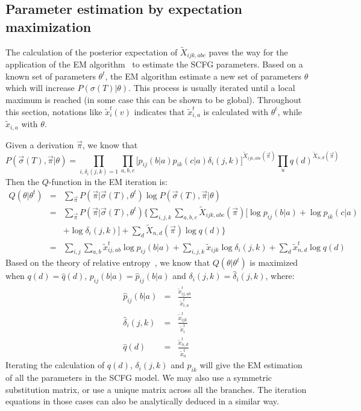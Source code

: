 \documentclass[pdftex,11pt]{article}
\begin{document}
\subsection{Parameter estimation by expectation maximization}
The calculation of the posterior expectation of $\tilde{X}_{ijk,abc}$
paves the way for the application of the EM
algorithm~\citep{em-dempster77} to estimate the SCFG parameters.  Based
on a known set of parameters $\theta^t$, the EM algorithm estimate a new
set of parameters $\theta$ which will increase
$P(\sigma(T)|\theta)$. This process is usually iterated until a local
maximum is reached (in some case this can be shown to be global).
Throughout this section, notations like $\tilde{x}^t_i(v)$ indicates
that $\tilde{x}^t_{i,a}$ is calculated with $\theta^t$, while
$\tilde{x}_{i,a}$ with $\theta$.

Given a derivation $\vec{\pi}$, we know that
\begin{equation}
  P(\vec{\sigma}(T),\vec{\pi}|\theta)=\prod_{i,\delta_i(j,k)=1}\prod_{a,b,c}\Big[p_{ij}(b|a)p_{ik}(c|a)
  \delta_i(j,k)\Big]^{\tilde{X}_{ijk,abc}(\vec{\pi})}
  \prod_u q(d)^{\tilde{X}_{n,d}(\vec{\pi})}
\end{equation}
Then the $Q$-function in the EM iteration is:
\begin{eqnarray}\label{equ:em-q}
  Q(\theta|\theta^t)&=&\sum_{\vec{\pi}}P(\vec{\pi}|\vec{\sigma}(T),\theta^t)\log P(\vec{\sigma}(T),\vec{\pi}|\theta)\nonumber\\
  &=&\sum_{\vec{\pi}}P(\vec{\pi}|\vec{\sigma}(T),\theta^t)\Bigg\{\sum_{i,j,k}\sum_{a,b,c}\tilde{X}_{ijk,abc}(\vec{\pi})\Big[\log p_{ij}(b|a)+\log p_{ik}(c|a)\nonumber\\
  &&+\log\delta_i(j,k)\Big]+\sum_d \tilde{X}_{n,d}(\vec{\pi})\log q(d)\nonumber\Bigg\}\\
  &=&\sum_{i,j}\sum_{a,b}\tilde{x}^t_{ij,ab}\log p_{ij}(b|a)+\sum_{i,j,k}\tilde{x}_{ijk}\log\delta_i(j,k)
  +\sum_d \tilde{x}^t_{n,d}\log q(d)
\end{eqnarray}
Based on the theory of relative entropy~\citep{durbin98}, we know that
$Q(\theta|\theta^t)$ is maximized when $q(d)=\hat{q}(d)$,
$p_{ij}(b|a)=\hat{p}_{ij}(b|a)$ and $\delta_i(j,k)=\hat{\delta}_i(j,k)$,
where:
\begin{eqnarray}
\hat{p}_{ij}(b|a)&=&\frac{\tilde{x}^t_{ij,ab}}{\tilde{x}^t_{i,a}}\\
\hat{\delta}_i(j,k)&=&\frac{\tilde{x}^t_{ijk}}{\tilde{x}^t_i}\\
\hat{q}(d)&=&\frac{\tilde{x}^t_{n,d}}{\tilde{x}^t_n}
\end{eqnarray}
Iterating the calculation of $q(d)$, $\delta_i(j,k)$ and $p_{ik}$ will
give the EM estimation of all the parameters in the SCFG model.  We may
also use a symmetric substitution matrix, or use a unique matrix across
all the branches. The iteration equations in those cases can also be
analytically deduced in a similar way.
\end{document}
